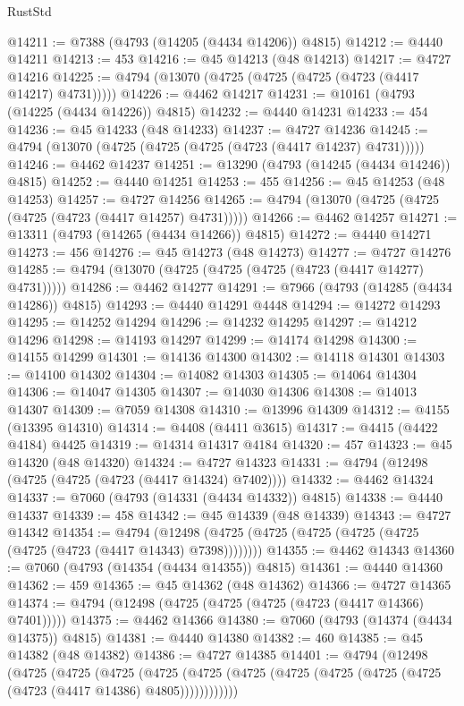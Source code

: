 \begin{lexlean}{RustStd}
\begin{coremodule}
{\begin{coremodule}
{{{{{{{{{{{{{{{{{{{{{{{{{{{{{{{{{{{{{{{{{{{{{{{{{{{{{{{{{{{{@14211 := @7388 (@4793 (@14205 (@4434 @14206)) @4815)
@14212 := @4440 @14211
@14213 := 453
@14216 := @45 @14213 (@48 @14213)
@14217 := @4727 @14216
@14225 := @4794 (@13070 (@4725 (@4725 (@4725 (@4723 (@4417 @14217) @4731)))))
@14226 := @4462 @14217
@14231 := @10161 (@4793 (@14225 (@4434 @14226)) @4815)
@14232 := @4440 @14231
@14233 := 454
@14236 := @45 @14233 (@48 @14233)
@14237 := @4727 @14236
@14245 := @4794 (@13070 (@4725 (@4725 (@4725 (@4723 (@4417 @14237) @4731)))))
@14246 := @4462 @14237
@14251 := @13290 (@4793 (@14245 (@4434 @14246)) @4815)
@14252 := @4440 @14251
@14253 := 455
@14256 := @45 @14253 (@48 @14253)
@14257 := @4727 @14256
@14265 := @4794 (@13070 (@4725 (@4725 (@4725 (@4723 (@4417 @14257) @4731)))))
@14266 := @4462 @14257
@14271 := @13311 (@4793 (@14265 (@4434 @14266)) @4815)
@14272 := @4440 @14271
@14273 := 456
@14276 := @45 @14273 (@48 @14273)
@14277 := @4727 @14276
@14285 := @4794 (@13070 (@4725 (@4725 (@4725 (@4723 (@4417 @14277) @4731)))))
@14286 := @4462 @14277
@14291 := @7966 (@4793 (@14285 (@4434 @14286)) @4815)
@14293 := @4440 @14291 @4448
@14294 := @14272 @14293
@14295 := @14252 @14294
@14296 := @14232 @14295
@14297 := @14212 @14296
@14298 := @14193 @14297
@14299 := @14174 @14298
@14300 := @14155 @14299
@14301 := @14136 @14300
@14302 := @14118 @14301
@14303 := @14100 @14302
@14304 := @14082 @14303
@14305 := @14064 @14304
@14306 := @14047 @14305
@14307 := @14030 @14306
@14308 := @14013 @14307
@14309 := @7059 @14308
@14310 := @13996 @14309
@14312 := @4155 (@13395 @14310)
@14314 := @4408 (@4411 @3615)
@14317 := @4415 (@4422 @4184) @4425
@14319 := @14314 @14317 @4184
@14320 := 457
@14323 := @45 @14320 (@48 @14320)
@14324 := @4727 @14323
@14331 := @4794 (@12498 (@4725 (@4725 (@4723 (@4417 @14324) @7402))))
@14332 := @4462 @14324
@14337 := @7060 (@4793 (@14331 (@4434 @14332)) @4815)
@14338 := @4440 @14337
@14339 := 458
@14342 := @45 @14339 (@48 @14339)
@14343 := @4727 @14342
@14354 := @4794
    (@12498 (@4725 (@4725 (@4725 (@4725 (@4725 (@4725 (@4723 (@4417 @14343) @7398))))))))
@14355 := @4462 @14343
@14360 := @7060 (@4793 (@14354 (@4434 @14355)) @4815)
@14361 := @4440 @14360
@14362 := 459
@14365 := @45 @14362 (@48 @14362)
@14366 := @4727 @14365
@14374 := @4794 (@12498 (@4725 (@4725 (@4725 (@4723 (@4417 @14366) @7401)))))
@14375 := @4462 @14366
@14380 := @7060 (@4793 (@14374 (@4434 @14375)) @4815)
@14381 := @4440 @14380
@14382 := 460
@14385 := @45 @14382 (@48 @14382)
@14386 := @4727 @14385
@14401 := @4794
    (@12498
      (@4725
        (@4725
          (@4725
            (@4725 (@4725 (@4725 (@4725 (@4725 (@4725 (@4725 (@4723 (@4417 @14386) @4805))))))))))))
}}}}}}}}}}}}}}}}}}}}}}}}}}}}}}}}}}}}}}}}}}}}}}}}}}}}}}}}}}}}
\end{coremodule}}
\end{coremodule}
\end{lexlean}
